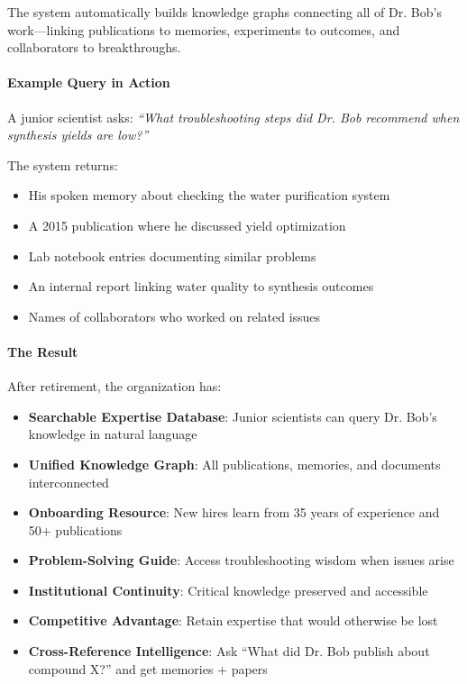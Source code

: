 \documentclass[11pt,letterpaper]{article}
\begin{document}
The system automatically builds knowledge graphs connecting all of Dr. Bob's work---linking publications to memories, experiments to outcomes, and collaborators to breakthroughs.

\paragraph{Example Query in Action}

A junior scientist asks: \textit{``What troubleshooting steps did Dr. Bob recommend when synthesis yields are low?''}

The system returns:
\begin{itemize}[leftmargin=*]
    \item His spoken memory about checking the water purification system
    \item A 2015 publication where he discussed yield optimization
    \item Lab notebook entries documenting similar problems
    \item An internal report linking water quality to synthesis outcomes
    \item Names of collaborators who worked on related issues
\end{itemize}

\paragraph{The Result}

After retirement, the organization has:
\begin{itemize}[leftmargin=*]
    \item \textcolor{secondarygreen}{\checkmark} \textbf{Searchable Expertise Database}: Junior scientists can query Dr. Bob's knowledge in natural language
    \item \textcolor{secondarygreen}{\checkmark} \textbf{Unified Knowledge Graph}: All publications, memories, and documents interconnected
    \item \textcolor{secondarygreen}{\checkmark} \textbf{Onboarding Resource}: New hires learn from 35 years of experience and 50+ publications
    \item \textcolor{secondarygreen}{\checkmark} \textbf{Problem-Solving Guide}: Access troubleshooting wisdom when issues arise
    \item \textcolor{secondarygreen}{\checkmark} \textbf{Institutional Continuity}: Critical knowledge preserved and accessible
    \item \textcolor{secondarygreen}{\checkmark} \textbf{Competitive Advantage}: Retain expertise that would otherwise be lost
    \item \textcolor{secondarygreen}{\checkmark} \textbf{Cross-Reference Intelligence}: Ask ``What did Dr. Bob publish about compound X?'' and get memories + papers
\end{itemize}
\end{document}
